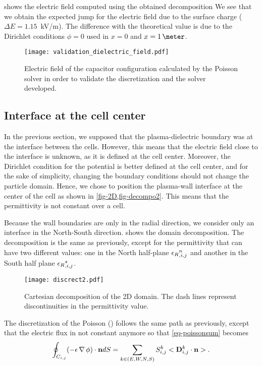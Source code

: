      shows the electric field computed using the obtained decomposition
    We see that we obtain the expected jump for the electric field due to the surface charge ($\Delta E = 1.15$~kV/m).
    The difference with the theoretical value is due to the Dirichlet conditions $\phi=0$ used in $x=0$ and $x=1\,\meter$.
    

    \begin{figure}[hbt]
      \centering
      \texttt{[image: validation\_dielectric\_field.pdf]}
      \caption{Electric field of the capacitor configuration calculated by the Poisson solver in order to validate the discretization and the solver developed. }
      \label{fig-surface}
    \end{figure}



  \subsection{Interface at the cell center}
    In the previous section, we supposed that the plasma-dielectric boundary was at the interface between the cells.
    However, this means that the electric field close to the interface is unknown, as it is defined at the cell center.
    Moreover, the Dirichlet condition for the potential is better defined at the cell center, and for the sake of simplicity, changing the boundary conditions should not change the particle domain.
    Hence, we chose to position the plasma-wall interface at the center of the cell as shown in \cref{fig-2D,fig-decompo2}.
    This means that the permittivity is not constant over a cell.

    Because the wall boundaries are only in the radial direction, we consider only an interface in the North-South direction.
     shows the domain decomposition.
    The decomposition is the same as previously, except for the permittivity that can have two different values\string: one in the North half-plane ${\epsilon_{R}}_{, i,j}^n$ and another in the South half plane ${\epsilon_{R}}_{, i,j}^s$.

    \begin{figure}[hbt]
      \centering
      \texttt{[image: discrect2.pdf]}
      \caption{Cartesian decomposition of the \acs{2D} domain. The dash lines represent discontinuities in the permittivity value.}
      \label{fig-decompo2}
    \end{figure}

    The discretization of the Poisson () follows the same path as previously, except that the electric flux in not constant anymore so that \cref{eq-poissonsum} becomes
    \begin{equation}
    \oint_{C_{i,j}} (-\epsilon \operatorname{{\mathbf \nabla}} \phi) \cdot {\mathbf n} dS = \sum_{k\in(E,W,N,S)} S^k_{i,j} <{\mathbf D}^k_{i,j} \cdot {\mathbf n}>.
    \end{equation}

